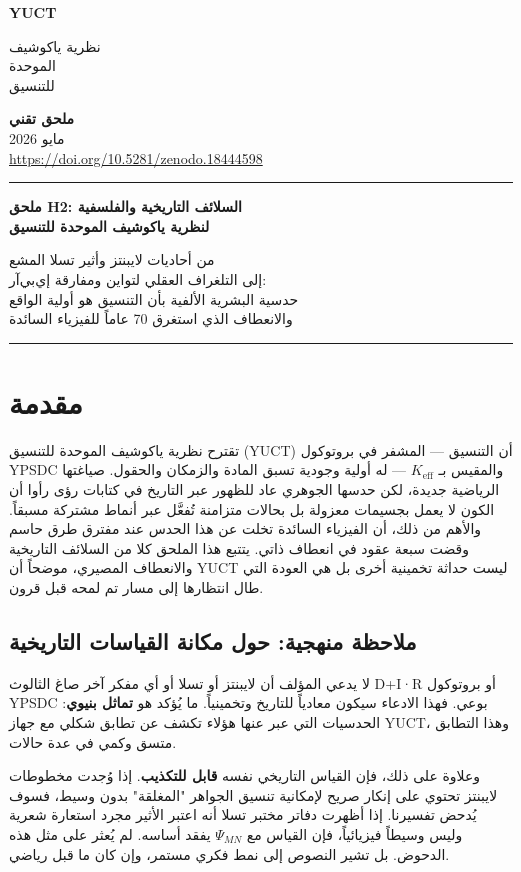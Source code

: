 \documentclass[12pt,a4paper]{article}
\newcommand{\makeheader}{%
	\noindent
	\begin{minipage}{0.17\textwidth}
		\raggedright
		{\sffamily\bfseries\color{skyblue}\fontsize{40}{40}\selectfont YUCT}%
	\end{minipage}%
	\hspace{30pt}
	\begin{minipage}{0.32\textwidth}
		\raggedright
		{\sffamily\fontsize{11}{13}\selectfont نظرية ياكوشيف\\ الموحدة\\ للتنسيق}%
	\end{minipage}%
	\hfill
	\begin{minipage}{0.38\textwidth}
		\raggedleft
		{\sffamily\bfseries ملحق تقني}\\
		{\sffamily مايو 2026}\\
		{\sffamily\footnotesize \scriptsize\url{https://doi.org/10.5281/zenodo.18444598}}%
	\end{minipage}
	\par\vspace{5pt}
	\noindent\textcolor{gold}{\rule{\textwidth}{1.6pt}}
	\par\vspace{0pt}
}
\begin{document}
	\thispagestyle{firstpage}
	\makeheader
	
	\vspace*{1cm}
	
	\begin{center}
		{\fontsize{28}{32}\selectfont\bfseries\color{darkblue}
			ملحق H2: السلائف التاريخية والفلسفية\\
			لنظرية ياكوشيف الموحدة للتنسيق}
		
		\vspace{1cm}
		\large
		من أحاديات لايبنتز وأثير تسلا المشع\\
		إلى التلغراف العقلي لتواين ومفارقة إي‌بي‌آر:\\
		حدسية البشرية الألفية بأن التنسيق هو أولية الواقع\\
		والانعطاف الذي استغرق 70 عاماً للفيزياء السائدة
	\end{center}
	
	\vspace{1.5cm}
	\noindent\textcolor{gold}{\rule{\textwidth}{1.6pt}}
	
	\section{مقدمة}
	
	تقترح نظرية ياكوشيف الموحدة للتنسيق (YUCT) أن التنسيق — المشفر في بروتوكول YPSDC والمقيس بـ \(K_{\mathrm{eff}}\) — له أولية وجودية تسبق المادة والزمكان والحقول. صياغتها الرياضية جديدة، لكن حدسها الجوهري عاد للظهور عبر التاريخ في كتابات رؤى رأوا أن الكون لا يعمل بجسيمات معزولة بل بحالات متزامنة تُفعَّل عبر أنماط مشتركة مسبقاً. والأهم من ذلك، أن الفيزياء السائدة تخلت عن هذا الحدس عند مفترق طرق حاسم وقضت سبعة عقود في انعطاف ذاتي. يتتبع هذا الملحق كلا من السلائف التاريخية والانعطاف المصيري، موضحاً أن YUCT ليست حداثة تخمينية أخرى بل هي العودة التي طال انتظارها إلى مسار تم لمحه قبل قرون.
	
	\subsection{ملاحظة منهجية: حول مكانة القياسات التاريخية}
	\label{subsec:methodological-note}
	
	لا يدعي المؤلف أن لايبنتز أو تسلا أو أي مفكر آخر صاغ الثالوث D+I·R أو بروتوكول YPSDC بوعي. فهذا الادعاء سيكون معادياً للتاريخ وتخمينياً. ما يُؤكد هو \textbf{تماثل بنيوي}: الحدسيات التي عبر عنها هؤلاء تكشف عن تطابق شكلي مع جهاز YUCT، وهذا التطابق متسق وكمي في عدة حالات.
	
	وعلاوة على ذلك، فإن القياس التاريخي نفسه \textbf{قابل للتكذيب}. إذا وُجدت مخطوطات لايبنتز تحتوي على إنكار صريح لإمكانية تنسيق الجواهر "المغلقة" بدون وسيط، فسوف يُدحض تفسيرنا. إذا أظهرت دفاتر مختبر تسلا أنه اعتبر الأثير مجرد استعارة شعرية وليس وسيطاً فيزيائياً، فإن القياس مع \(\Psi_{MN}\) يفقد أساسه. لم يُعثر على مثل هذه الدحوض. بل تشير النصوص إلى نمط فكري مستمر، وإن كان ما قبل رياضي.
	
\end{document}
